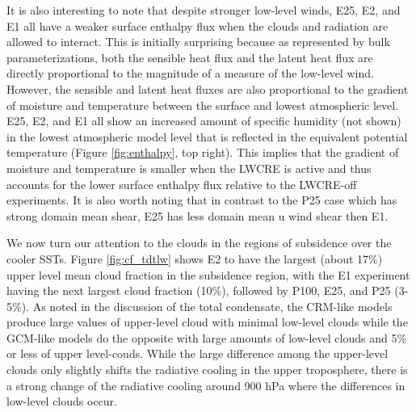 \documentclass[draft]{agujournal2019}
\begin{document}
{It is also interesting to note that despite stronger low-level winds, E25, E2, and E1 all have a weaker surface
enthalpy flux when the clouds and radiation are allowed to interact.  This is initially surprising because as represented 
by bulk parameterizations, both the sensible heat flux and the latent heat flux are directly proportional to the 
magnitude of a measure of the low-level wind.  However, the sensible and latent heat fluxes are also 
proportional to the gradient of moisture and temperature between the surface and lowest atmospheric 
level.    
E25, E2, and E1 all show an increased amount of specific humidity (not shown) in the lowest atmospheric 
model level that is reflected in the equivalent potential temperature (Figure \ref{fig:enthalpy}, top right).  This 
implies that the gradient of moisture and temperature is smaller when the LWCRE is active and thus accounts 
for the lower surface enthalpy flux relative to the LWCRE-off experiments.         
It is also worth noting that in contrast to the P25 case which has strong domain mean shear, E25 has less domain 
mean u wind shear then E1.  


We now turn our attention to the clouds in the regions of subsidence over the cooler SSTs.
Figure \ref{fig:cf_tdtlw} shows E2 to have the largest (about 17\%) upper level mean cloud
fraction in the subsidence region, with the E1 experiment having the next largest cloud fraction (10\%), followed by 
P100, E25, and P25 (3-5\%).  As noted in the discussion of the total condensate, the CRM-like models 
produce large values of upper-level cloud with minimal low-level clouds while the GCM-like models
do the opposite with large amounts of low-level clouds and 5\% or less of upper level-couds.   
While the large difference among the upper-level clouds only slightly shifts the radiative cooling in the
upper troposphere, there is a strong change of the radiative cooling around 900 hPa where the 
differences in low-level clouds occur.  

}
\end{document}
